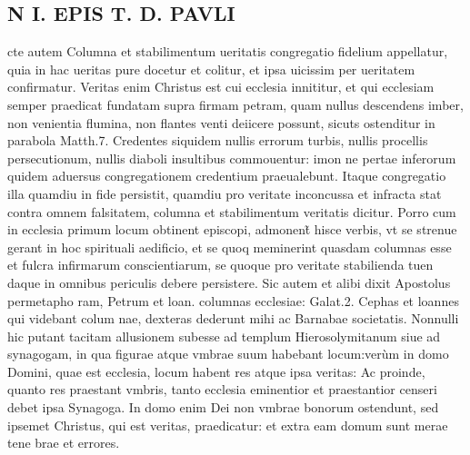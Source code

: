 \documentclass{article}
\begin{document}
\begin{pages}
\section*{N I. EPIS T. D. PAVLI }
\marginpar{[ p.88 ]}\pstart cte autem Columna et stabilimentum ueritatis congregatio fidelium appellatur, quia in hac ueritas pure docetur et colitur, et ipsa uicissim per ueritatem confirmatur. Veritas enim Christus est cui ecclesia innititur, et qui ecclesiam semper praedicat fundatam supra firmam petram, quam nullus descendens imber, non venientia flumina, non flantes venti deiicere possunt, sicuts ostenditur in parabola Matth.7. Credentes siquidem nullis errorum turbis, nullis procellis persecutionum, nullis diaboli insultibus commouentur: imon ne pertae inferorum quidem aduersus congregationem credentium praeualebunt. Itaque congregatio illa quamdiu in fide persistit, quamdiu pro veritate inconcussa et infracta stat contra omnem falsitatem, columna et stabilimentum veritatis dicitur. Porro cum in ecclesia primum locum obtinent episcopi, admonent̃ hisce verbis, vt se strenue gerant in hoc spirituali aedificio, et se quoq meminerint quasdam columnas esse et fulcra infirmarum conscientiarum, se quoque pro veritate stabilienda tuen daque in omnibus periculis debere persistere. Sic autem et alibi dixit Apostolus permetapho ram, Petrum et loan. columnas ecclesiae: Galat.2. Cephas et loannes qui videbant colum nae, dexteras dederunt mihi ac Barnabae societatis. Nonnulli hic putant tacitam allusionem subesse ad templum Hierosolymitanum siue ad synagogam, in qua figurae atque vmbrae suum habebant locum:verùm in domo Domini, quae est ecclesia, locum habent res atque ipsa veritas: Ac proinde, quanto res praestant vmbris, tanto ecclesia eminentior et praestantior censeri debet ipsa Synagoga. In domo enim Dei non vmbrae bonorum ostendunt, sed ipsemet Christus, qui est veritas, praedicatur: et extra eam domum sunt merae tene brae et errores.  \pend
{}
{}

\end{pages}
\end{document}
